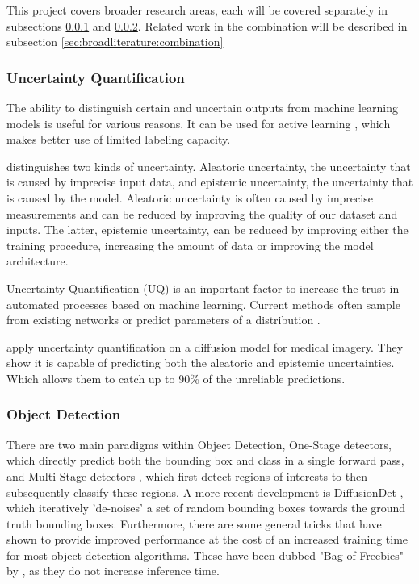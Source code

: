 This project covers broader research areas, each will be covered separately in subsections \ref{sec:broadliterature:uncertainty} and \ref{sec:broadliterature:object_detection}. Related work in the combination will be described in subsection \ref{sec:broadliterature:combination}

\subsubsection{Uncertainty Quantification}\label{sec:broadliterature:uncertainty}
The ability to distinguish certain and uncertain outputs from machine learning models is useful for various reasons. It can be used for active learning \cite{yang2009effective,settles2009active,houlsby2011bayesian,Bernhardt_2022}, which makes better use of limited labeling capacity.

\citep{gal2016uncertainty} distinguishes two kinds of uncertainty. Aleatoric uncertainty, the uncertainty that is caused by imprecise input data, and epistemic uncertainty, the uncertainty that is caused by the model. Aleatoric uncertainty is often caused by imprecise measurements and can be reduced by improving the quality of our dataset and inputs. The latter, epistemic uncertainty, can be reduced by improving either the training procedure, increasing the amount of data or improving the model architecture.

Uncertainty Quantification (UQ) is an important factor to increase the trust in automated processes based on machine learning. Current methods often sample from existing networks \cite{gal2016dropout,NEURIPS2019_118921ef,miller2019evaluating} or predict parameters of a distribution \cite{choi2019gaussian,swiatkowski2020ktied}.

\citep{tanno2021uncertainty} apply uncertainty quantification on a diffusion model for medical imagery. They show it is capable of predicting both the aleatoric and epistemic uncertainties. Which allows them to catch up to 90\% of the unreliable predictions.

\subsubsection{Object Detection}\label{sec:broadliterature:object_detection}

There are two main paradigms within Object Detection, One-Stage detectors\cite{zhou2019objects, bochkovskiy2020yolov4, wang2022yolov7, liu2016ssd, duan2019centernet}, which directly predict both the bounding box and class in a single forward pass, and Multi-Stage detectors \cite{girshick2014rich, girshick2015fast}, which first detect regions of interests to then subsequently classify these regions. A more recent development is DiffusionDet \cite{chen2023diffusiondet}, which iteratively 'de-noises' a set of random bounding boxes towards the ground truth bounding boxes. Furthermore, there are some general tricks that have shown to provide improved performance at the cost of an increased training time for most object detection algorithms. These have been dubbed "Bag of Freebies" by \citep*{zhang2019bag}, as they do not increase inference time.

